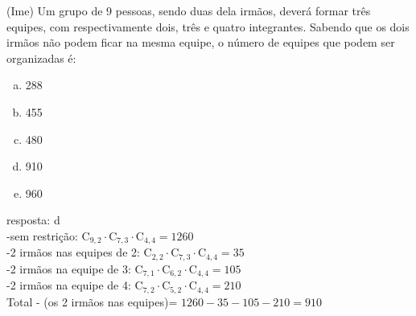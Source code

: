 \begin{ex}
(Ime) Um grupo de 9 pessoas, sendo duas dela irmãos, deverá formar três equipes, com respectivamente dois, três e quatro integrantes. Sabendo que os dois irmãos não podem ficar na mesma equipe, o número de equipes que podem ser organizadas é:
   \begin{enumerate}[(a)]
   \item 288
   \item 455
   \item 480
   \item 910
   \item 960
   \end{enumerate}
    \begin{sol}
     resposta: d \\
     -sem restrição: $\mathrm{C}_{9,2}\cdot\mathrm{C}_{7,3}\cdot\mathrm{C}_{4,4}=1260$\\
     -2 irmãos nas equipes de 2:
     $\mathrm{C}_{2,2}\cdot\mathrm{C}_{7,3}\cdot\mathrm{C}_{4,4}=35$ \\
     -2 irmãos na equipe de 3: $\mathrm{C}_{7,1}\cdot\mathrm{C}_{6,2}\cdot\mathrm{C}_{4,4}=105$ \\
     -2 irmãos na equipe de 4:
     $\mathrm{C}_{7,2}\cdot\mathrm{C}_{5,2}\cdot\mathrm{C}_{4,4}=210$ \\
     Total - (os 2 irmãos nas equipes)= $1260-35-105-210=910$
    \end{sol}
\end{ex}
